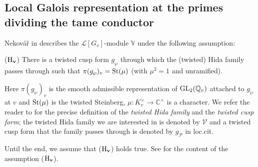 \documentclass[12pt]{amsart}
\numberwithin{equation}{section}
\begin{document}
 \subsection{Local Galois representation at the primes dividing the tame conductor}
 \label{subsec:localgaloistame}
 Nekov\'a\v{r} in \cite[Proposition 12.7.14.1]{nek} describes the ${\mathcal{L}}[G_v]$-module ${\mathbb{V}}$ under the following assumption:

 ($\mathbf{\textup{H}_v}$) There is a twisted cusp form $g_{\wp}$ through which the (twisted) Hida family passes through such that $\pi(g_\wp)_v=\textup{St}(\mu)$ (with $\mu^2=1$ and unramified).
 
 Here $\pi(g_\wp)_v$ is the smooth admissible representation of $\textup{GL}_2({\mathbb{Q}}_v)$ 
  attached to $g_\wp$ at $v$ and $\textup{St}(\mu)$ is the twisted Steinberg, $\mu:K_v^\times {\rightarrow} \mathbb{C}^\times$ is a character. We refer the reader to \cite[\S12.7.10]{nek} for the precise definition of the \emph{twisted Hida family} and the \emph{twisted cusp form}; the twisted Hida family we are interested in is denoted by $\mathcal{V}$ and a twisted cusp form that the family passes through is denoted by $g_{\mathcal{P}}$ in loc.cit.
  
 Until the end, we assume that ($\mathbf{\textup{H}_v}$) holds true.  See \cite[\S12.3 and \S12.7]{nek} for the content of the assumption  ($\mathbf{\textup{H}_v}$). 
    
\end{document}
